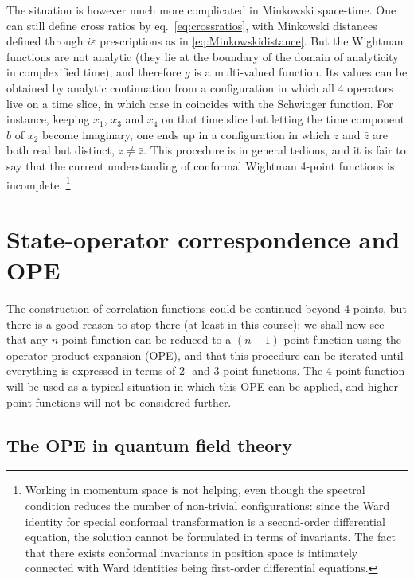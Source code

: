 \documentclass[a4paper,12pt]{article}
\numberwithin{equation}{section}
\begin{document}
The situation is however much more complicated in Minkowski space-time. One can still define cross ratios by eq.~\eqref{eq:crossratios}, with Minkowski distances defined through $i \varepsilon$ prescriptions as in \eqref{eq:Minkowskidistance}. But the Wightman functions are not analytic (they lie at the boundary of the domain of analyticity in complexified time), and therefore $g$ is a multi-valued function. Its values can be obtained by analytic continuation from a configuration in which all 4 operators live on a time slice, in which case in coincides with the Schwinger function. For instance, keeping $x_1$, $x_3$ and $x_4$ on that time slice but letting the time component $b$ of $x_2$ become imaginary, one ends up in a configuration in which $z$ and $\bar{z}$ are both real but distinct, $z \neq \bar{z}$. This procedure is in general tedious, and it is fair to say that the current understanding of conformal Wightman 4-point functions is incomplete.%
%
\footnote{Working in momentum space is not helping, even though the spectral condition reduces the number of non-trivial configurations: since the Ward identity for special conformal transformation is a second-order differential equation, the solution cannot be formulated in terms of invariants. The fact that there exists conformal invariants in position space is intimately connected with Ward identities being first-order differential equations.}



\section{State-operator correspondence and OPE}
\label{sec:OPE}

The construction of correlation functions could be continued beyond 4 points, but there is a good reason to stop there (at least in this course): we shall now see that any $n$-point function can be reduced to a $(n-1)$-point function using the operator product expansion (OPE), and that this procedure can be iterated until everything is expressed in terms of 2- and 3-point functions. The 4-point function will be used as a typical situation in which this OPE can be applied, and higher-point functions will not be considered further.


\subsection{The OPE in quantum field theory}
\end{document}
